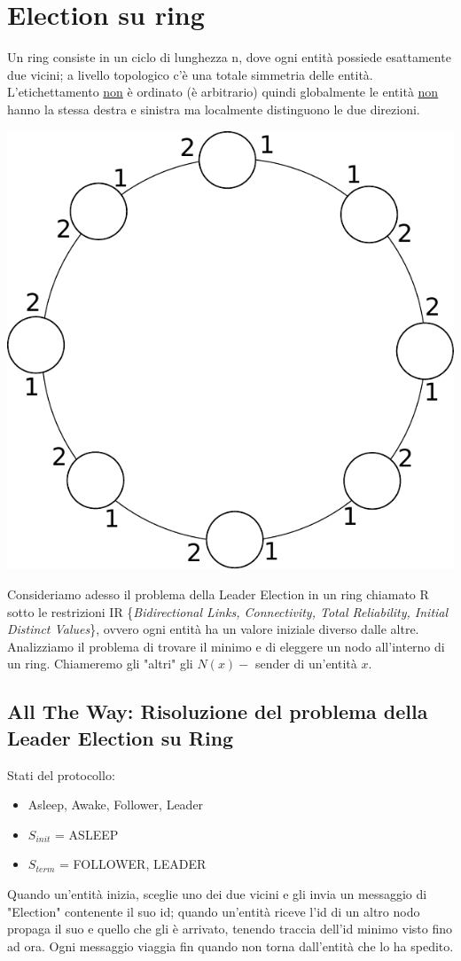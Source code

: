 \section{Election su ring}
Un ring consiste in un ciclo di lunghezza n, dove ogni entità possiede
esattamente due vicini; a livello topologico c'è una totale simmetria delle
entità.\\
L'etichettamento \underline{non} è ordinato (è arbitrario) quindi globalmente le
entità \underline{non} hanno la stessa destra e sinistra ma localmente
distinguono le due direzioni.
\begin{center}
    \includegraphics[scale=0.5]{images/n_43}
\end{center}
Consideriamo adesso il problema della Leader Election in un ring chiamato R
sotto le restrizioni IR \{\textit{Bidirectional Links, Connectivity, Total
    Reliability, Initial Distinct Values}\}, ovvero ogni entità ha un valore
iniziale diverso dalle altre.\\ Analizziamo il problema di trovare il minimo e
di eleggere un nodo all'interno di un ring. Chiameremo gli "altri" gli $N(x) - $
sender di un'entità $x$.

\subsection{All The Way: Risoluzione del problema della Leader Election su Ring}
Stati del protocollo:
\begin{itemize}
    \item Asleep, Awake, Follower, Leader
    \item $S_{init}$ = ASLEEP
    \item $S_{term}$ = FOLLOWER, LEADER
\end{itemize}
Quando un'entità inizia, sceglie uno dei due vicini e gli invia un messaggio di
"Election" contenente il suo id; quando un'entità riceve l'id di un altro nodo
propaga il suo e quello che gli è arrivato, tenendo traccia dell'id minimo visto
fino ad ora. Ogni messaggio viaggia fin quando non torna dall'entità che lo ha
spedito.

